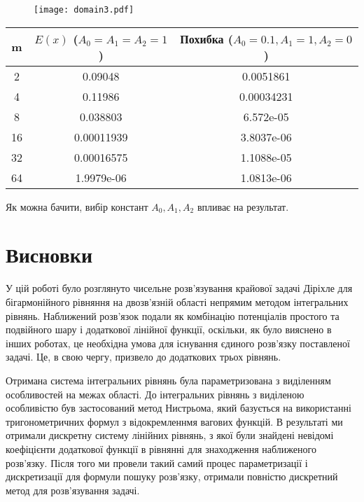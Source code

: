 \documentclass[12pt]{report}
\begin{document}
  \begin{figure}[h!]
\centering
	\texttt{[image: domain3.pdf]}
	\vspace*{-1cm}
\end{figure}

\begin{center}
\begin{tabular}{ |c|c|c| } 
 \hline
 m & \shortstack{$E(x)$  \\  ($A_0=A_1=A_2=1$)}  & \shortstack{Похибка  \\  ($A_0=0.1, A_1= 1,A_2=0$)}  \\ 
 \hline
 2 & 0.09048 & 0.0051861 \\ 
 4 & 0.11986 & 0.00034231 \\ 
 8 & 0.038803 & 6.572e-05 \\ 
16 & 0.00011939 & 3.8037e-06 \\ 
32 & 0.00016575 & 1.1088e-05 \\ 
64 & 1.9979e-06 & 1.0813e-06 \\ 
 \hline
\end{tabular}
\end{center}
 
 Як можна бачити, вибір констант $A_0,A_1,A_2$ впливає на результат.
 
 \newpage
 
\chapter*{Висновки}

У цій роботі було розглянуто чисельне розв'язування крайової задачі Діріхле для бігармонійного рівняння на двозв'язній області непрямим методом інтегральних рівнянь. Наближений розв'язок подали як комбінацію потенціалів простого та подвійного шару і додаткової лінійної функції, оскільки, як було вияснено в інших роботах, це необхідна умова для існування єдиного розв'язку поставленої задачі. Це, в свою чергу, призвело до додаткових трьох рівнянь.

Отримана система інтегральних рівнянь була параметризована з виділенням особливостей на межах області. До інтегральних рівнянь з виділеною особливістю був застосований метод Нистрьома, який базується на використанні тригонометричних формул з відокремленнмя вагових функцій. В результаті ми отримали дискретну систему лінійних рівнянь, з якої були знайдені невідомі коефіцієнти додаткової функції в рівнянні для знаходження наближеного розв'язку. Після того ми провели такий самий процес параметризації і дискретизації для формули пошуку розв'язку, отримали повністю дискретний метод для розв'язування задачі.
\end{document}
